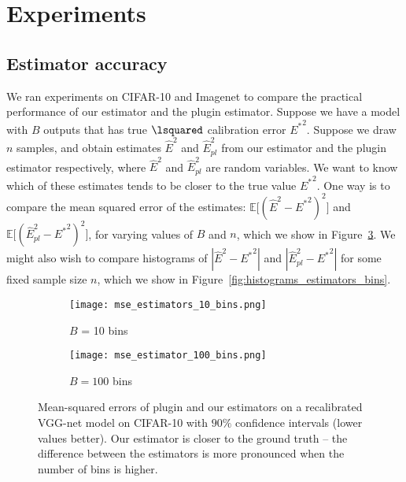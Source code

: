 \section{Experiments}

\subsection{Estimator accuracy}

We ran experiments on CIFAR-10 and Imagenet to compare the practical performance of our estimator and the plugin estimator. Suppose we have a model with $B$ outputs that has true $\lsquared$ calibration error ${E^*}^2$. Suppose we draw $n$ samples, and obtain estimates $\hat{E}^2$ and $\hat{E}_{pl}^2$ from our estimator and the plugin estimator respectively, where $\hat{E}^2$ and $\hat{E}_{pl}^2$ are random variables. We want to know which of these estimates tends to be closer to the true value ${E^*}^2$. One way is to compare the mean squared error of the estimates: $\mathbb{E}\big[ (\hat{E}^2 - {E^*}^2)^2 \big]$  and $\mathbb{E}\big[ (\hat{E}_{pl}^2 - {E^*}^2)^2 \big]$, for varying values of $B$ and $n$, which we show in Figure~\ref{fig:mse_estimators_bins}. We might also wish to compare histograms of $|\hat{E}^2 - {E^*}^2|$ and $|\hat{E}_{pl}^2 - {E^*}^2|$ for some fixed sample size $n$, which we show in Figure~\ref{fig:histograms_estimators_bins}.

\begin{figure}
  \centering
  \centering
     \begin{subfigure}[b]{0.45\textwidth}
         \centering
         \texttt{[image: mse\_estimators\_10\_bins.png]}
         \caption{$B$ = 10 bins}
         \label{fig:y equals x}
     \end{subfigure}
     \hfill
     \begin{subfigure}[b]{0.45\textwidth}
         \centering
         \texttt{[image: mse\_estimator\_100\_bins.png]}
         \caption{$B = 100$ bins}
         \label{fig:three sin x}
     \end{subfigure}
  \caption{Mean-squared errors of plugin and our estimators on a recalibrated VGG-net model on CIFAR-10 with $90\%$ confidence intervals (lower values better). Our estimator is closer to the ground truth -- the difference between the estimators is more pronounced when the number of bins is higher.}
  \label{fig:mse_estimators_bins}
\end{figure}

